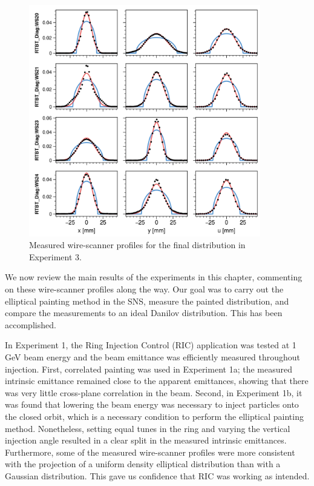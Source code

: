 %
\begin{figure}[!p]
    \centering
    \includegraphics[width=0.9\textwidth]{Images/chapter5/exp3/fits_7.png}
    \caption{Measured wire-scanner profiles for the final distribution in Experiment 3.}
    \label{fig:exp3_fits}
\end{figure}
%

We now review the main results of the experiments in this chapter, commenting on these wire-scanner profiles along the way. Our goal was to carry out the elliptical painting method in the SNS, measure the painted distribution, and compare the measurements to an ideal Danilov distribution. This has been accomplished. 

In Experiment 1, the Ring Injection Control (RIC) application was tested at 1 GeV beam energy and the beam emittance was efficiently measured throughout injection. First, correlated painting was used in Experiment 1a; the measured intrinsic emittance remained close to the apparent emittances, showing that there was very little cross-plane correlation in the beam. Second, in Experiment 1b, it was found that lowering the beam energy was necessary to inject particles onto the closed orbit, which is a necessary condition to perform the elliptical painting method. Nonetheless, setting equal tunes in the ring and varying the vertical injection angle resulted in a clear split in the measured intrinsic emittances. Furthermore, some of the measured wire-scanner profiles were more consistent with the projection of a uniform density elliptical distribution than with a Gaussian distribution. This gave us confidence that RIC was working as intended.

